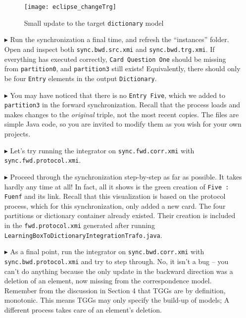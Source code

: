 \begin{itemize}
\newpage

\begin{figure}[htbp]
\begin{center}
  \texttt{[image: eclipse\_changeTrg]}
  \caption{Small update to the target \texttt{dictionary} model}
  \label{eclipse:changeTrg}
\end{center}
\end{figure}

\item[$\blacktriangleright$] Run the synchronization a final time, and refresh the ``instances'' folder. Open and inspect both \texttt{sync.bwd.src.xmi} and
\texttt{sync.\-bwd.\-trg.\-xmi}. If everything has executed correctly, \texttt{Card Question One} should be missing from \texttt{partition0}, and
\texttt{partition3} still exists! Equivalently, there should only be four \texttt{Entry} elements in the output \texttt{Dict\-ion\-ar\-y}.

\item[$\blacktriangleright$] You may have noticed that there is no \texttt{Entry Five}, which we added to \texttt{partition3} in the forward
synchronization. Recall that the process loads and makes changes to the \emph{original} triple, not the most recent copies. The files are simple Java code, so
you are invited to modify them as you wish for your own projects.

\item[$\blacktriangleright$] Let's try running the integrator on \texttt{sync.fwd.corr.xmi} with \texttt{sync.\-fwd.\-prot\-o\-col.\-xmi}.

\item[$\blacktriangleright$] Proceed through the synchronization step-by-step as far as possible. It takes hardly any time at all! In fact, all it shows is the
green creation of \texttt{Five : Fuenf} and its link. Recall that this visualization is based on the protocol process, which for this synchronization, only
added a new card. The four partitions or dictionary container already existed. Their creation is included in the \texttt{fwd.protocol.xmi} generated
after running \texttt{LearningBoxToDictionaryIntegrationTrafo.java}.

\item[$\blacktriangleright$] As a final point, run the integrator on \texttt{sync.bwd.corr.xmi} with \texttt{sync.\-bwd.\-pro\-to\-col.\-xmi} and try to step
through. No, it isn't a bug -- you can't do anything because the only update in the backward direction was a deletion of an element, now missing from the
correspondence model. Remember from the discussion in Section 4 that TGGs are by definition, monotonic. This means TGGs may only specify the build-up of models; A different
process takes care of an element's deletion.

\end{itemize}
